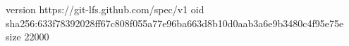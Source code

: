 version https://git-lfs.github.com/spec/v1
oid sha256:633f78392028ff67c808f055a77e96ba663d8b10d0aab3a6e9b3480c4f95e75e
size 22000
